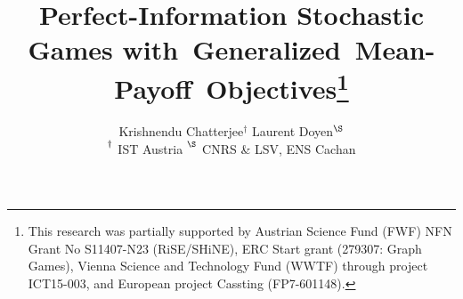 \documentclass{article}
\begin{document}
\sloppy



\title{{\bf Perfect-Information Stochastic Games \mbox{with Generalized Mean-Payoff Objectives}}\thanks{This research was partially supported by Austrian Science Fund (FWF) 
NFN Grant No S11407-N23 (RiSE/SHiNE), ERC Start grant (279307: Graph Games), 
Vienna Science and Technology Fund (WWTF) through project ICT15-003,
and European project Cassting (FP7-601148).
}}

\author{
Krishnendu Chatterjee$^\dag$ \quad  Laurent Doyen$^{\S}$ \\ 
\normalsize
 $\strut^\dag$ IST Austria \quad $\strut^\S$ CNRS \& LSV, ENS Cachan 
}

\date{}
\maketitle


\begin{comment}
\title{Perfect-Information Stochastic Games with Generalized Mean-Payoff 
Objectives\thanks{This research was supported by Austrian Science Fund (FWF) 
NFN Grant No S11407-N23 (RiSE/SHiNE), ERC Start grant (279307: Graph Games), 
Vienna Science and Technology Fund (WWTF) through project ICT15-003,
and European project Cassting (FP7-601148).
}}

\authorinfo{Krishnendu Chatterjee}
{IST Austria} 
{krish.chat@ist.ac.at} 
\authorinfo{Laurent Doyen}
{LSV, ENS Cachan \& CNRS, France} 
{doyen@lsv.fr}
\end{comment}
\end{document}
